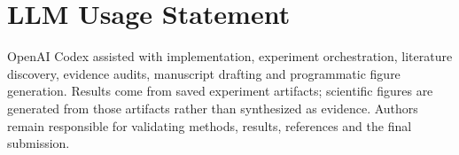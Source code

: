 \documentclass[10pt,twocolumn,letterpaper]{article}
\begin{document}
\section*{LLM Usage Statement}
OpenAI Codex assisted with implementation, experiment orchestration, literature discovery, evidence audits, manuscript drafting and programmatic figure generation. Results come from saved experiment artifacts; scientific figures are generated from those artifacts rather than synthesized as evidence. Authors remain responsible for validating methods, results, references and the final submission.
{\small}
\end{document}
